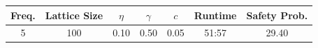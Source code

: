 \begin{tabular}{ccccccc}
\toprule
Freq. & Lattice Size & $\eta$ & $\gamma$ & $c$ & Runtime & Safety Prob. \\
\midrule
5 & 100 & 0.10 & 0.50 & 0.05 & 51:57 & 29.40 \\
\bottomrule
\end{tabular}
